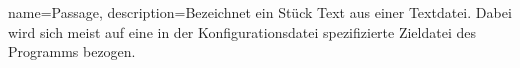 \makeglossaries

{
    name=Passage,
    description={Bezeichnet ein Stück Text aus einer Textdatei. Dabei
            wird sich meist auf eine in der Konfigurationsdatei spezifizierte
            Zieldatei des Programms bezogen.}
}

\glsaddall